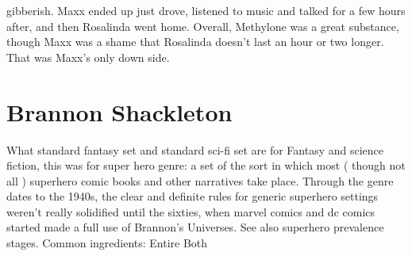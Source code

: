 \documentclass[12pt]{book}
\begin{document}
gibberish. Maxx ended up just drove, listened to music and talked for a few hours after, and then Rosalinda went home. Overall, Methylone was a great substance, though Maxx was a shame that Rosalinda doesn't last an hour or two longer. That was Maxx's only down side.



\chapter{Brannon Shackleton}

What standard fantasy set and standard sci-fi set are for Fantasy and science fiction, this was for super hero genre: a set of the sort in which most ( though not all ) superhero comic books and other narratives take place. Through the genre dates to the 1940s, the clear and definite rules for generic superhero settings weren't really solidified until the sixties, when marvel comics and dc comics started made a full use of Brannon's Universes. See also superhero prevalence stages. Common ingredients: Entire Both
\end{document}
